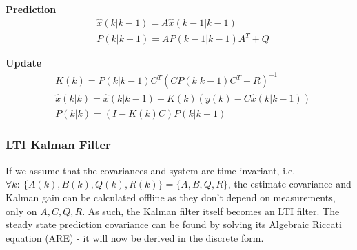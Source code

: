 \textbf{Prediction}
\begin{align}
	&\hat{{x}}	(k|k-1) = {A} \hat{{x}}	(k-1|k-1) 		\label{eq:Kalman_pred_state_compact} 	\\
	&{P}			(k|k-1) = {A}{P}			(k-1|k-1){A}^T+{Q} 				\label{eq:Kalman_pred_cov_compact} 		
\end{align}

\textbf{Update}
\begin{align}
	&{K}			(k) 		= {P}				(k|k-1){C}^T({C}{P}	(k|k-1)	{C}^T + {R})^{-1}										\label{eq:Kalman_upd_kalman_gain_compact} \\
	&\hat{{x}}	(k|k) 	= \hat{{x}}			(k|k-1) + {K}						(k)	({y}		(k) - {C}\hat{{x}}		(k|k-1)) 	\label{eq:Kalman_upd_est_state_compact} \\
	&{P}			(k|k) 	= ({I} - {K}	(k){C}){P}					(k|k-1)																		\label{eq:Kalman_upd_est_cov_compact}
\end{align}


\subsubsection{LTI Kalman Filter}
If we assume that the covariances and system are time invariant, i.e. $\forall k: \ \{A(k),B(k),Q(k),R(k)\} = \{A,B,Q,R\} $, the estimate covariance and Kalman gain can be calculated offline as they don't depend on measurements, only on $ {A}, {C}, {Q}, {R} $. As such, the Kalman filter itself becomes an LTI filter. The steady state prediction covariance can be found by solving its Algebraic Riccati equation (ARE) - it will now be derived in the discrete form.\\


